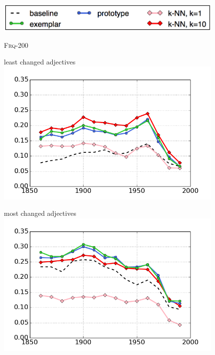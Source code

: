 \documentclass[output=paper]{langsci/langscibook}
\begin{document}
\begin{figure}[p]
\begin{minipage}{\textwidth}
  \centering
  \includegraphics[width=.50\linewidth]{figures/GREWAL_legend_b.png}
\end{minipage}
\begin{center}
    \textsc{Frq-200}
\end{center}

\begin{minipage}{.5\textwidth}
   least changed adjectives
  \includegraphics[width=.95\linewidth]{figures/GREWAL_frq200_least_changed.png}
\end{minipage}\begin{minipage}{.5\textwidth}
   most changed adjectives
  \includegraphics[width=.95\linewidth]{figures/GREWAL_frq200_most_changed.png}
\end{minipage}


\end{figure}
\end{document}
